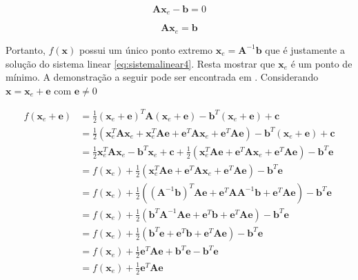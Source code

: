 \begin{equation}
    \mathbf{A}\mathbf{x}_e - \mathbf{b} = 0
\end{equation}

\begin{equation}
    \mathbf{A}\mathbf{x}_e = \mathbf{b}
\end{equation}

Portanto, $f(\mathbf{x})$ possui um único ponto extremo $\mathbf{x}_e = \mathbf{A}^{-1}\mathbf{b}$ que é justamente a solução do sistema linear \eqref{eq:sistemalinear4}. Resta mostrar que $\mathbf{x}_e$ é um ponto de mínimo. A demonstração a seguir pode ser encontrada em \citet{Shewchuk94anintroduction}. Considerando $\mathbf{x} = \mathbf{x}_e + \mathbf{e}$ com $\mathbf{e} \neq 0 $


\begin{align}
     f(\mathbf{x}_e + \mathbf{e}) & =  \frac{1}{2} (\mathbf{x}_e + \mathbf{e})^T \mathbf{A} (\mathbf{x}_e + \mathbf{e}) - \mathbf{b}^T(\mathbf{x}_e + \mathbf{e}) + \mathbf{c}  \nonumber\\
                & =  \frac{1}{2} (\mathbf{x}_e^T\mathbf{A}\mathbf{x}_e + \mathbf{x}_e^T\mathbf{A}\mathbf{e} + \mathbf{e}^T\mathbf{A}\mathbf{x}_e + \mathbf{e}^T\mathbf{A}\mathbf{e} )- \mathbf{b}^T(\mathbf{x}_e + \mathbf{e}) + \mathbf{c}  \nonumber\\
                & =  \frac{1}{2} \mathbf{x}_e^T\mathbf{A}\mathbf{x}_e -\mathbf{b}^T\mathbf{x}_e + \mathbf{c} + \frac{1}{2} ( \mathbf{x}_e^T\mathbf{A}\mathbf{e} + \mathbf{e}^T\mathbf{A}\mathbf{x}_e + \mathbf{e}^T\mathbf{A}\mathbf{e} ) - \mathbf{b}^T\mathbf{e}  \nonumber\\
                & =  f(\mathbf{x}_e) + \frac{1}{2} ( \mathbf{x}_e^T\mathbf{A}\mathbf{e} + \mathbf{e}^T\mathbf{A}\mathbf{x}_e + \mathbf{e}^T\mathbf{A}\mathbf{e} ) - \mathbf{b}^T\mathbf{e}  \nonumber\\
                & =  f(\mathbf{x}_e) + \frac{1}{2} ( (\mathbf{A}^{-1}\mathbf{b})^T\mathbf{A}\mathbf{e} + \mathbf{e}^T\mathbf{A}\mathbf{A}^{-1}\mathbf{b} + \mathbf{e}^T\mathbf{A}\mathbf{e} ) - \mathbf{b}^T\mathbf{e}  \nonumber\\
                & =  f(\mathbf{x}_e) + \frac{1}{2} ( \mathbf{b}^T\mathbf{A}^{-1}\mathbf{A}\mathbf{e} + \mathbf{e}^T\mathbf{b} + \mathbf{e}^T\mathbf{A}\mathbf{e} ) - \mathbf{b}^T\mathbf{e}  \nonumber\\
                & =  f(\mathbf{x}_e) + \frac{1}{2} ( \mathbf{b}^T\mathbf{e} + \mathbf{e}^T\mathbf{b} + \mathbf{e}^T\mathbf{A}\mathbf{e} ) - \mathbf{b}^T\mathbf{e}  \nonumber\\
                & =  f(\mathbf{x}_e) + \frac{1}{2}  \mathbf{e}^T\mathbf{A}\mathbf{e}  + \mathbf{b}^T\mathbf{e} - \mathbf{b}^T\mathbf{e}  \nonumber\\
                & =  f(\mathbf{x}_e) + \frac{1}{2}  \mathbf{e}^T\mathbf{A}\mathbf{e} \nonumber
\end{align}


